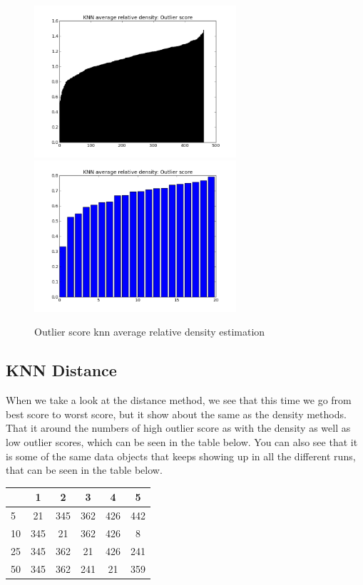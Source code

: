 \begin{figure}[H]
\centering
\includegraphics[width=7.5cm, keepaspectratio=true]{pictures/knnAvgdensityEstimationAll.png}
\includegraphics[width=7.5cm, keepaspectratio=true]{pictures/knnAvgdensityEstimation20.png}
\vspace{-0.4cm}
\caption{\footnotesize Outlier score knn average relative density estimation}
\label{avg}
\end{figure}

\subsection{KNN Distance}

When we take a look at the distance method, we see that this time we go from best score to worst score, but it show about the same as the density methods. That it around the numbers of high outlier score as with the density as well as low outlier scores, which can be seen in the table below. You can also see that it is some of the same data objects that keeps showing up in all the different runs, that can be seen in the table below.

\begin{table}[H]
\begin{longtable}{lccccc}
\hline
   & 1   & 2   & 3   & 4   & 5   \\ \hline
5  & 21  & 345 & 362 & 426 & 442 \\ 
10 & 345 & 21  & 362 & 426 & 8   \\ 
25 & 345 & 362 & 21  & 426 & 241 \\
50 & 345 & 362 & 241 & 21  & 359 \\ \hline
\end{longtable}
\end{table}


